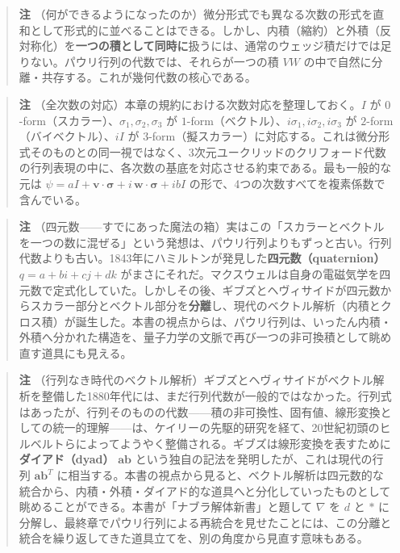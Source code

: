 \documentclass[a4paper,12pt,openany]{book}
\begin{document}
\begin{quote}
\textbf{注}
（何ができるようになったのか）微分形式でも異なる次数の形式を直和として形式的に並べることはできる。しかし、内積（縮約）と外積（反対称化）を\textbf{一つの積として同時に}扱うには、通常のウェッジ積だけでは足りない。パウリ行列の代数では、それらが一つの積
\(VW\) の中で自然に分離・共存する。これが幾何代数の核心である。
\end{quote}

\begin{quote}
\textbf{注}
（全次数の対応）本章の規約における次数対応を整理しておく。\(I\) が
\(0\)-form（スカラー）、\(\sigma_1,\sigma_2,\sigma_3\) が
\(1\)-form（ベクトル）、\(i\sigma_1,i\sigma_2,i\sigma_3\) が
\(2\)-form（バイベクトル）、\(iI\) が
\(3\)-form（擬スカラー）に対応する。これは微分形式そのものとの同一視ではなく、3次元ユークリッドのクリフォード代数の行列表現の中に、各次数の基底を対応させる約束である。最も一般的な元は
\(\psi = aI + \mathbf{v}\!\cdot\!\bm{\sigma} + i\,\mathbf{w}\!\cdot\!\bm{\sigma} + ibI\)
の形で、4つの次数すべてを複素係数で含んでいる。
\end{quote}

\begin{quote}
\textbf{注}
（四元数——すでにあった魔法の箱）実はこの「スカラーとベクトルを一つの数に混ぜる」という発想は、パウリ行列よりもずっと古い。行列代数よりも古い。1843年にハミルトンが発見した\textbf{四元数（quaternion）}
\(q = a + bi + cj + dk\)
がまさにそれだ。マクスウェルは自身の電磁気学を四元数で定式化していた。しかしその後、ギブズとヘヴィサイドが四元数からスカラー部分とベクトル部分を\textbf{分離}し、現代のベクトル解析（内積とクロス積）が誕生した。本書の視点からは、パウリ行列は、いったん内積・外積へ分かれた構造を、量子力学の文脈で再び一つの非可換積として眺め直す道具にも見える。
\end{quote}

\begin{quote}
\textbf{注}
（行列なき時代のベクトル解析）ギブズとヘヴィサイドがベクトル解析を整備した1880年代には、まだ行列代数が一般的ではなかった。行列式はあったが、行列そのものの代数——積の非可換性、固有値、線形変換としての統一的理解——は、ケイリーの先駆的研究を経て、20世紀初頭のヒルベルトらによってようやく整備される。ギブズは線形変換を表すために\textbf{ダイアド（dyad）}
\(\mathbf{a}\mathbf{b}\) という独自の記法を発明したが、これは現代の行列
\(\mathbf{a}\mathbf{b}^T\)
に相当する。本書の視点から見ると、ベクトル解析は四元数的な統合から、内積・外積・ダイアド的な道具へと分化していったものとして眺めることができる。本書が「ナブラ解体新書」と題して
\(\nabla\) を \(d\) と \(\ast\)
に分解し、最終章でパウリ行列による再統合を見せたことには、この分離と統合を繰り返してきた道具立てを、別の角度から見直す意味もある。
\end{quote}
\end{document}
